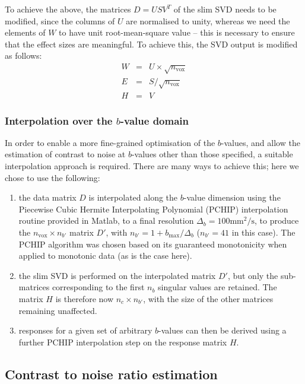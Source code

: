\documentclass{article}
\newcommand{\nvox}{n_{\textrm{vox}}}
\newcommand{\mms}{\textrm{mm}^2/\textrm{s}}
\begin{document}
To achieve the above, the matrices $D = USV^T$ of the slim SVD needs to be
modified, since the columns of $U$ are normalised to unity, whereas we need the
elements of $W$ to have unit root-mean-square value -- this is necessary to
ensure that the effect sizes are meaningful. To achieve this, the SVD
output is modified as follows: 
\begin{eqnarray}
W & = & U \times \sqrt{\nvox} \\
E & = & S / \sqrt{\nvox} \\
H & = & V
\end{eqnarray}


\subsubsection{Interpolation over the $b$-value domain}
In order to enable a more fine-grained optimisation of the $b$-values,
and allow the estimation of contrast to noise at $b$-values other than those
specified, a suitable interpolation approach is required. There are many ways
to achieve this; here we chose to use the following: 
\begin{enumerate}
\item the data matrix $D$ is interpolated along the $b$-value dimension using
the Piecewise Cubic Hermite Interpolating Polynomial (PCHIP) interpolation
routine provided in Matlab, to a final resolution $\Delta_b = 100 \mms$, to
produce the $\nvox \times n_{b'}$ matrix $D'$, with $n_{b'} = 1 + b_{\textrm{max}} / \Delta_b$ 
($n_{b'} = 41$ in this case). The PCHIP algorithm was chosen based on its
guaranteed monotonicity when applied to monotonic data (as is the case here).
\item the slim SVD is performed on the interpolated matrix $D'$, but only the
sub-matrices corresponding to the first $n_b$ singular values are retained. The
matrix $H$ is therefore now $n_c \times n_{b'}$, with the size of the other
matrices remaining unaffected.
\item responses for a given set of arbitrary $b$-values can then be derived
using a further PCHIP interpolation step on the response matrix $H$.
\end{enumerate} 

\subsection{Contrast to noise ratio estimation}
\end{document}

